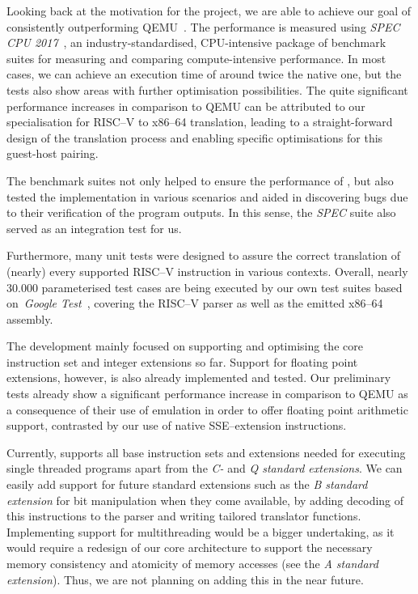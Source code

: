 Looking back at the motivation for the project, we are able to achieve our goal of consistently outperforming QEMU~\cite{bellard2005qemu}.
The performance is measured using \textit{SPEC CPU 2017}~\cite{spec-cpu-2017}, an industry-standardised, CPU-intensive package of benchmark suites for measuring and comparing compute-intensive performance.
In most cases, we can achieve an execution time of around twice the native one, but the tests also show areas with further optimisation possibilities.
The quite significant performance increases in comparison to QEMU can be attributed to our specialisation for RISC--V to x86--64 translation, leading to a straight-forward design of the translation process and enabling specific optimisations for this guest-host pairing.

The benchmark suites not only helped to ensure the performance of \translatorname{}, but also tested the implementation in various scenarios and aided in discovering bugs due to their verification of the program outputs.
In this sense, the \textit{SPEC} suite also served as an integration test for us.

Furthermore, many unit tests were designed to assure the correct translation of (nearly) every supported RISC--V instruction in various contexts.
Overall, nearly 30.000 parameterised test cases are being executed by our own test suites based on~\textit{Google Test}~\cite{gtest}, covering the RISC--V parser as well as the emitted x86--64 assembly.

The development mainly focused on supporting and optimising the core instruction set and integer extensions so far.
Support for floating point extensions, however, is also already implemented and tested.
Our preliminary tests already show a significant performance increase in comparison to QEMU as a consequence of their use of emulation in order to offer floating point arithmetic support, contrasted by our use of native SSE--extension instructions.

Currently, \translatorname{} supports all base instruction sets and extensions needed for executing single threaded programs apart from the \textit{C-} and \textit{Q standard extensions}.
We can easily add support for future standard extensions such as the \textit{B standard extension} for bit manipulation when they come available, by adding decoding of this instructions to the parser and writing tailored translator functions.
Implementing support for multithreading would be a bigger undertaking, as it would require a redesign of our core architecture to support the necessary memory consistency and atomicity of memory accesses (see the \textit{A standard extension}).
Thus, we are not planning on adding this in the near future.

